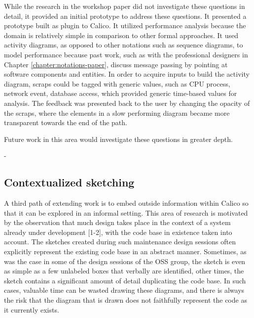 While the research in the workshop paper did not investigate these questions in detail, it provided an initial prototype to address these questions. It presented a prototype built as plugin to Calico. It utilized performance analysis because the domain is relatively simple in comparison to other formal approaches. It used activity diagrams, as opposed to other notations such as sequence diagrams, to model performance because past work, such as with the professional designers in Chapter \ref{chapter:notations-paper}, discuss message passing by pointing at software components and entities. In order to acquire inputs to build the activity diagram, scraps could be tagged with generic values, such as CPU process, network event, database access, which provided generic time-based values for analysis. The feedback was presented back to the user by changing the opacity of the scraps, where the elements in a slow performing diagram became more transparent towards the end of the path.

Future work in this area would investigate these questions in greater depth. 

%
- 

\subsection{Contextualized sketching}

A third path of extending work is to embed outside information within Calico so that it can be explored in an informal setting. This area of research is motivated by the observation that much design takes place in the context of a system already under development [1-2], with the code base in existence taken into account. The sketches created during such maintenance design sessions often explicitly represent the existing code base in an abstract manner. Sometimes, as was the case in some of the design sessions of the OSS group, the sketch is even as simple as a few unlabeled boxes that verbally are identified, other times, the sketch contains a significant amount of detail duplicating the code base. In such cases, valuable time can be wasted drawing these diagrams, and there is always the risk that the diagram that is drawn does not faithfully represent the code as it currently exists.

